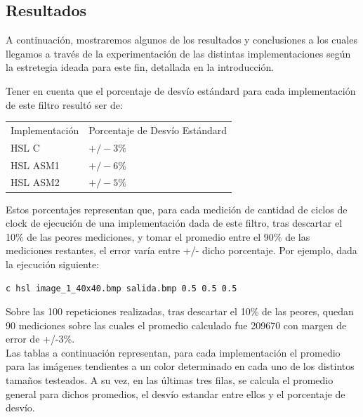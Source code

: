 \subsection{Resultados}
A continuación, mostraremos algunos de los resultados y conclusiones a los cuales llegamos a través de la experimentación de las distintas implementaciones según la estretegia ideada para este fin, detallada en la introducción.

Tener en cuenta que el porcentaje de desvío estándard para cada implementación de este filtro resultó ser de:
\begin{tabular}{| l | l |}
\hline
Implementación & Porcentaje de Desvío Estándard \\
HSL C	& $+/- 3\%$\\
HSL ASM1 & 	$+/- 6\%$\\
HSL ASM2	& $+/- 5\%$\\
\hline
\end{tabular}

Estos porcentajes representan que, para cada medición de cantidad de ciclos de clock de ejecución de una implementación dada de este filtro, tras descartar el 10\% de las peores mediciones, y tomar el promedio entre el 90\% de las mediciones restantes, el error varía entre +/- dicho porcentaje. Por ejemplo, dada la ejecución siguiente:

\begin{verbatim}
c hsl image_1_40x40.bmp salida.bmp 0.5 0.5 0.5
\end{verbatim}
Sobre las 100 repeticiones realizadas, tras descartar el 10\% de las peores, quedan 90 mediciones sobre las cuales el promedio calculado fue 209670 con margen de error de +/-3\%.\\

Las tablas a continuación representan, para cada implementación el promedio para las imágenes tendientes a un color determinado en cada uno de los distintos tamaños testeados. A su vez, en las últimas tres filas, se calcula el promedio general para dichos promedios, el desvío estandar entre ellos y el porcentaje de desvío.

